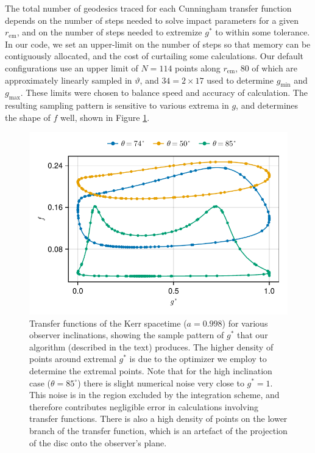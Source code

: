 \documentclass[fleqn,usenatbib]{mnras}
\begin{document}
The total number of geodesics traced for each Cunningham transfer function
depends on the number of steps needed to solve impact parameters for a given
$r_\text{em}$, and on the number of steps needed to extremize $g^\ast$ to within
some tolerance. In our code, we set an upper-limit on the number of steps so
that memory can be contiguously allocated, and the cost of curtailing some
calculations. Our default configurations use an upper limit of $N = 114$ points
along $r_\text{em}$, $80$ of which are approximately linearly sampled in
$\vartheta$, and $34 = 2 \times 17$ used to determine $g_\text{min}$ and
$g_\text{max}$. These limits were chosen to balance speed and accuracy of
calculation. The resulting sampling pattern is sensitive to various extrema in
$g$, and determines the shape of $f$ well, shown in Figure
\ref{fig:transfer-sampling-pattern}.

\begin{figure}
    \centering
    \includegraphics[width=0.95\linewidth]{figures/transfer-functions.sampling.pdf}
    \caption{Transfer functions of the Kerr spacetime ($a = 0.998$) for various
        observer inclinations, showing the sample pattern of $g^\ast$ that our
        algorithm (described in the text) produces. The higher
        density of points around extremal $g^\ast$ is due to the optimizer we
        employ to determine the extremal points. Note that for the high
        inclination case ($\theta = 85^\circ$) there is slight numerical noise
        very close to $g^\ast = 1$. This noise is in the region excluded by the
        integration scheme, and therefore contributes negligible error in
        calculations involving transfer functions. There is also a high density
        of points on the lower branch of the transfer function, which is an
        artefact of the projection of the disc onto the observer's plane.
    }
    \label{fig:transfer-sampling-pattern}
\end{figure}
\end{document}
